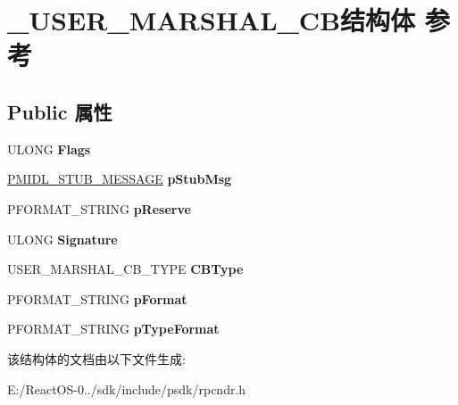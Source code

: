 \hypertarget{struct___u_s_e_r___m_a_r_s_h_a_l___c_b}{}\section{\+\_\+\+U\+S\+E\+R\+\_\+\+M\+A\+R\+S\+H\+A\+L\+\_\+\+C\+B结构体 参考}
\label{struct___u_s_e_r___m_a_r_s_h_a_l___c_b}
\subsection*{Public 属性}
\begin{DoxyCompactItemize}
\item 
\mbox{\label{struct___u_s_e_r___m_a_r_s_h_a_l___c_b_a8a2ec905d57bdb52ecbd8d2af7f15fa4}} 
U\+L\+O\+NG {\bfseries Flags}
\item 
\mbox{\label{struct___u_s_e_r___m_a_r_s_h_a_l___c_b_ad12407e4209f512b6e18ed2f0088a03b}} 
\hyperlink{struct___m_i_d_l___s_t_u_b___m_e_s_s_a_g_e}{P\+M\+I\+D\+L\+\_\+\+S\+T\+U\+B\+\_\+\+M\+E\+S\+S\+A\+GE} {\bfseries p\+Stub\+Msg}
\item 
\mbox{\label{struct___u_s_e_r___m_a_r_s_h_a_l___c_b_ab81f6ab7a0cd736eb3d2a76a61d1b74c}} 
P\+F\+O\+R\+M\+A\+T\+\_\+\+S\+T\+R\+I\+NG {\bfseries p\+Reserve}
\item 
\mbox{\label{struct___u_s_e_r___m_a_r_s_h_a_l___c_b_ac16968f4558255973801318ad6bc9721}} 
U\+L\+O\+NG {\bfseries Signature}
\item 
\mbox{\label{struct___u_s_e_r___m_a_r_s_h_a_l___c_b_a60dd8b3b7deffa7bb9d28b5eeb8d7262}} 
U\+S\+E\+R\+\_\+\+M\+A\+R\+S\+H\+A\+L\+\_\+\+C\+B\+\_\+\+T\+Y\+PE {\bfseries C\+B\+Type}
\item 
\mbox{\label{struct___u_s_e_r___m_a_r_s_h_a_l___c_b_a5585c528047d4e532fc5adee6171fefd}} 
P\+F\+O\+R\+M\+A\+T\+\_\+\+S\+T\+R\+I\+NG {\bfseries p\+Format}
\item 
\mbox{\label{struct___u_s_e_r___m_a_r_s_h_a_l___c_b_a837f54b56dbfd7e4bf35dc0d51f7263f}} 
P\+F\+O\+R\+M\+A\+T\+\_\+\+S\+T\+R\+I\+NG {\bfseries p\+Type\+Format}
\end{DoxyCompactItemize}


该结构体的文档由以下文件生成\+:\begin{DoxyCompactItemize}
\item 
E\+:/\+React\+O\+S-\/0../sdk/include/psdk/rpcndr.\+h\end{DoxyCompactItemize}

